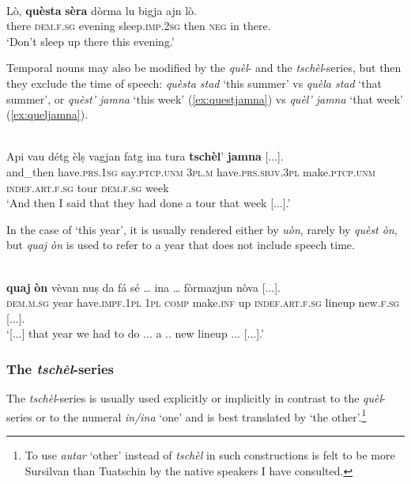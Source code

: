 \ea
{}\\
\gll Lò, \textbf{quèsta} \textbf{sèra} dòrma lu bigja ajn lò.\\
there \textsc{dem.f.sg} evening sleep.\textsc{imp.2sg} then  \textsc{neg} in there.\\
\glt `Don't sleep up there this evening.'
\z

Temporal nouns may also be modified by the \textit{quèl}- and the \textit{tschèl}-series, but then they exclude the time of speech: \textit{quèsta stad} `this summer' vs \textit{quèla stad} `that summer', or \textit{quèst' jamna} `this week' (\ref{ex:questjamna}) vs \textit{quèl' jamna} `that week'  (\ref{ex:queljamna}).

\ea\label{ex:queljamna}
\\
\gll Api vau détg èlṣ vagjan fatg ina tura \textbf{tschèl}’ \textbf{jamna} [...].\\  
and\_then have.\textsc{prs.1sg} say.\textsc{ptcp.unm} \textsc{3pl.m} have.\textsc{prs.sbjv.3pl} make.\textsc{ptcp.unm} \textsc{indef.art.f.sg} tour  \textsc{dem.f.sg} week\\
\glt `And then I said that they had done a tour that week [...].'
\z

In the case of `this year', it is usually rendered either by \textit{uòn}, rarely by  \textit{quèst òn}, but \textit{quaj òn} is used to refer to a year that does not include speech time.

\ea
{}\\
\gll [...] \textbf{quaj} \textbf{òn} vèvan nuṣ da fá sé … ina … fòrmazjun nòva [...].\\
{} \textsc{dem.m.sg} year have.\textsc{impf.1pl} \textsc{1pl} \textsc{comp} make.\textsc{inf} up {} \textsc{indef.art.f.sg} {} lineup  new.\textsc{f.sg} [...].\\
\glt `[...] that year we had to do ... a .. new lineup ... [...].'
\z


\subsubsection{The \textit{tschèl}-series}
The \textit{tschèl}-series is usually used explicitly or implicitly in contrast to the \textit{quèl}-series or to the numeral \textit{in/ina} `one' and is best translated by `the other'.\footnote{To use \textit{autar} `other' instead of \textit{tschèl} in such constructions is felt to be more Sursilvan than Tuatschin by the native speakers I have consulted.}

